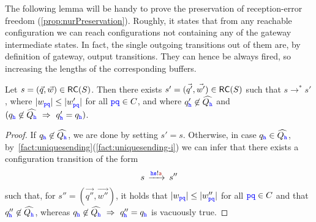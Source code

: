 The following lemma will be handy to prove the preservation of reception-error freedom (\cref{prop:nurPreservation}). Roughly, it states that from any reachable configuration we can reach
configurations not containing any of the gateway intermediate states. 
In fact, the single outgoing transitions out of them are, by definition of gateway, output transitions. They can hence be always fired, so increasing the lengths of the corresponding buffers.
\begin{lemma}
\label{lem:addendum}
Let $s = (\vec{q},\vec{w}) \in \RS(S)$. Then there exists $s'= (\vec{q'},\vec{w'}) \in \RS(S)$ such that $s \to^* s'$, where
$|w_{\ttp\ttq}| \leq |w'_{\ttp\ttq}|$ for all $\ttp\ttq \in C$, and where
$q'_{\HH}\not\in\widehat{Q_{\HH}}$ and
 $(q_{\HH}\not\in\widehat{Q_{\HH}} \implies q'_{\HH}= q_{\HH})$.
\end{lemma}
\begin{proof}
If ${q}_{\HH}\not\in\widehat{Q_{\HH}}$, we are done by setting $s'=s$.
Otherwise, in case ${q}_{\HH}\in\widehat{Q_{\HH}}$, 
by~\cref{fact:uniquesending}(\ref{fact:uniquesending-i}) we can infer that there exists a configuration transition of the form
$$
s \lts{\HH\tts!\msg[a]} s''
$$
such that, for $s'' = (\vec{q''}, \vec{w''})$, it holds that 
$|w_{\ttp\ttq}| \leq |w''_{\ttp\ttq}|$ for all $\ttp\ttq \in C$ and that
$q''_{\HH}\not\in \widehat{Q_{\HH}}$, whereas
$q_{\HH}\not\in\widehat{Q_{\HH}} \implies q''_{\HH}= q_{\HH}$
is vacuously true.
\end{proof}

















